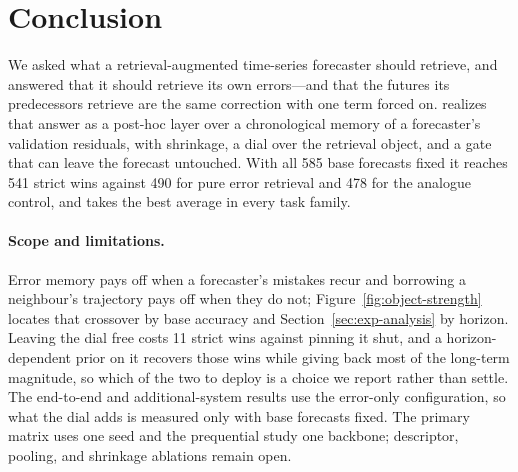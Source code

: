 \section{Conclusion}
\label{sec:conclusion}

We asked what a retrieval-augmented time-series forecaster should retrieve, and
answered that it should retrieve its own errors---and that the futures its
predecessors retrieve are the same correction with one term forced on. \method{}
realizes that answer as a post-hoc layer over a chronological memory of a
forecaster's validation residuals, with shrinkage, a dial over the retrieval object,
and a gate that can leave the forecast untouched. With all 585 base forecasts fixed
it reaches 541 strict wins against 490 for pure error retrieval and 478 for the
analogue control, and takes the best average in every task family.

\paragraph{Scope and limitations.}
Error memory pays off when a forecaster's mistakes recur and borrowing a
neighbour's trajectory pays off when they do not; Figure~\ref{fig:object-strength}
locates that crossover by base accuracy and Section~\ref{sec:exp-analysis} by
horizon. Leaving the dial free costs 11 strict wins against pinning it shut, and a
horizon-dependent prior on it recovers those wins while giving back most of the
long-term magnitude, so which of the two to deploy is a choice we report rather
than settle. The end-to-end and additional-system results use the error-only
configuration, so what the dial adds is measured only with base forecasts fixed. The
primary matrix uses one seed and the prequential study one backbone; descriptor,
pooling, and shrinkage ablations remain open.\label{sec:main-text-end}
